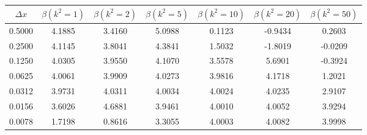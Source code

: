 \begin{tabular}{|c|c|c|c|c|c|c|}
\hline
\textbf{$\Delta x$}&\textbf{$\beta(k^2=1)$}&\textbf{$\beta(k^2=2)$}&\textbf{$\beta(k^2=5)$}&\textbf{$\beta(k^2=10)$}&\textbf{$\beta(k^2=20)$}&\textbf{$\beta(k^2=50)$}\\\hline
0.5000&4.1885&3.4160&5.0988&0.1123&-0.9434&0.2603\\\hline
0.2500&4.1145&3.8041&4.3841&1.5032&-1.8019&-0.0209\\\hline
0.1250&4.0305&3.9550&4.1070&3.5578&5.6901&-0.3924\\\hline
0.0625&4.0061&3.9909&4.0273&3.9816&4.1718&1.2021\\\hline
0.0312&3.9731&4.0311&4.0034&4.0024&4.0235&2.9107\\\hline
0.0156&3.6026&4.6881&3.9461&4.0010&4.0052&3.9294\\\hline
0.0078&1.7198&0.8616&3.3055&4.0003&4.0082&3.9998\\\hline
\end{tabular}
